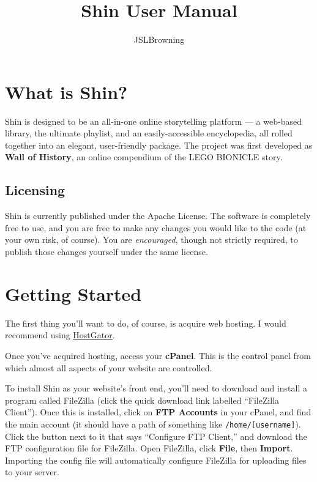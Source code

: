 \documentclass[11pt]{article} %
\title{Shin User Manual}
\author{JSLBrowning}
\begin{document}
\maketitle

\section{What is Shin?}

Shin is designed to be an all-in-one online storytelling platform — a web-based library, the ultimate playlist, and an easily-accessible encyclopedia, all rolled together into an elegant, user-friendly package. The project was first developed as \textbf{Wall of History}, an online compendium of the LEGO BIONICLE story.

\subsection{Licensing}

Shin is currently published under the Apache License. The software is completely free to use, and you are free to make any changes you would like to the code (at your own risk, of course). You are \textit{encouraged}, though not strictly required, to publish those changes yourself under the same license.

\section{Getting Started}

The first thing you’ll want to do, of course, is acquire web hosting. I would recommend using \href{https://www.hostgator.com/}{HostGator}.

Once you’ve acquired hosting, access your \textbf{cPanel}. This is the control panel from which almost all aspects of your website are controlled.

To install Shin as your website’s front end, you’ll need to download and install a program called FileZilla (click the quick download link labelled “FileZilla Client”). Once this is installed, click on \textbf{FTP Accounts} in your cPanel, and find the main account (it should have a path of something like \texttt{/home/[username]}). Click the button next to it that says “Configure FTP Client,” and download the FTP configuration file for FileZilla. Open FileZilla, click \textbf{File}, then \textbf{Import}. Importing the config file will automatically configure FileZilla for uploading files to your server.
\end{document}
